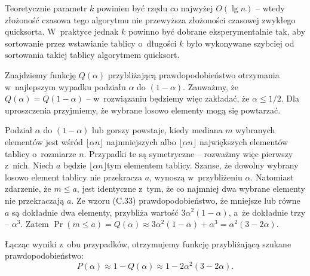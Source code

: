 Teoretycznie parametr $k$ powinien być rzędu co najwyżej $O(\lg n)$ -- wtedy złożoność czasowa tego algorytmu nie przewyższa złożoności czasowej zwykłego quicksorta.
W~praktyce jednak $k$ powinno być dobrane eksperymentalnie tak, aby sortowanie przez wstawianie tablicy o~długości $k$ było wykonywane szybciej od sortowania takiej tablicy algorytmem quicksort.

\exercise %
Znajdziemy funkcję $Q(\alpha)$ przybliżającą prawdopodobieństwo otrzymania w~najlepszym wypadku podziału $\alpha$ do $(1-\alpha)$.
Zauważmy, że $Q(\alpha)=Q(1-\alpha)$ -- w~rozwiązaniu będziemy więc zakładać, że $\alpha\le1/2$.
Dla uproszczenia przyjmiemy, że wybrane losowo elementy mogą się powtarzać.

Podział $\alpha$ do $(1-\alpha)$ lub gorszy powstaje, kiedy mediana $m$ wybranych elementów jest wśród $\lfloor\alpha n\rfloor$ najmniejszych albo $\lfloor\alpha n\rfloor$ największych elementów tablicy o~rozmiarze $n$.
Przypadki te są symetryczne -- rozważmy więc pierwszy z~nich.
Niech $a$ będzie $\lfloor\alpha n\rfloor$\nbhyphen tym elementem tablicy.
Szanse, że dowolny wybrany losowo element tablicy nie przekracza $a$, wynoszą w~przybliżeniu $\alpha$.
Natomiast zdarzenie, że $m\le a$, jest identyczne z~tym, że co najmniej dwa wybrane elementy nie przekraczają $a$.
Ze wzoru (C.33) prawdopodobieństwo, że mniejsze lub równe $a$ są dokładnie dwa elementy, przybliża wartość $3\alpha^2(1-\alpha)$, a~że dokładnie trzy -- $\alpha^3$.
Zatem $\Pr(m\le a)=Q(\alpha)\approx3\alpha^2(1-\alpha)+\alpha^3=\alpha^2(3-2\alpha)$.

Łącząc wyniki z~obu przypadków, otrzymujemy funkcję przybliżającą szukane prawdopodobieństwo:
\[
    P(\alpha) \approx 1-Q(\alpha) \approx 1-2\alpha^2(3-2\alpha).
\]
